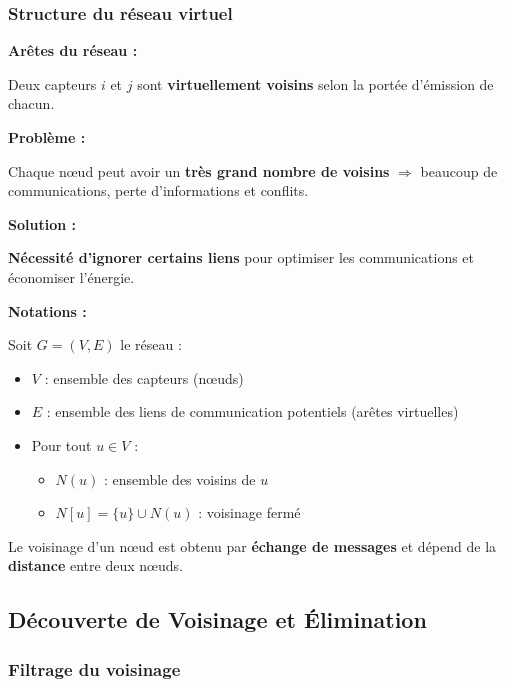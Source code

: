 \documentclass[12pt,a4paper]{article}
\begin{document}
\subsubsection{Structure du réseau virtuel}

\begin{definition}
\textbf{Arêtes du réseau :}

Deux capteurs $i$ et $j$ sont \textcolor{titrebleu}{\textbf{virtuellement voisins}} selon la portée d'émission de chacun.

\textbf{Problème :}

Chaque nœud peut avoir un \textcolor{importantrouge}{\textbf{très grand nombre de voisins}} $\Rightarrow$ beaucoup de communications, perte d'informations et conflits.

\textbf{Solution :}

\textcolor{defvert}{\textbf{Nécessité d'ignorer certains liens}} pour optimiser les communications et économiser l'énergie.
\end{definition}

\begin{notecours}
\textbf{Notations :}

Soit $G = (V, E)$ le réseau :
\begin{itemize}
    \item $V$ : ensemble des capteurs (nœuds)
    \item $E$ : ensemble des liens de communication potentiels (arêtes virtuelles)
    \item Pour tout $u \in V$ :
    \begin{itemize}
        \item $N(u)$ : ensemble des voisins de $u$
        \item $N[u] = \{u\} \cup N(u)$ : voisinage fermé
    \end{itemize}
\end{itemize}

Le voisinage d'un nœud est obtenu par \textcolor{algoviolet}{\textbf{échange de messages}} et dépend de la \textcolor{titrebleu}{\textbf{distance}} entre deux nœuds.
\end{notecours}

\newpage
\subsection{Découverte de Voisinage et Élimination}

\subsubsection{Filtrage du voisinage}
\end{document}
